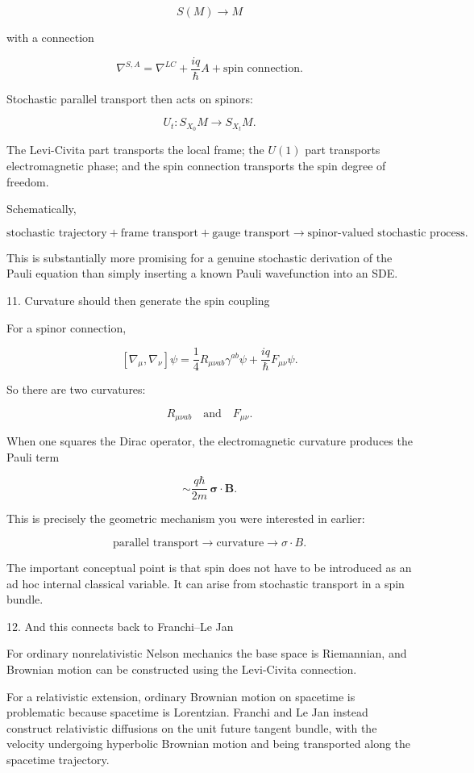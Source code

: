 $$ S(M)\rightarrow M $$

with a connection

$$ \nabla^{S,A} = \nabla^{LC} + \frac{iq}{\hbar}A + \text{spin connection}. $$

Stochastic parallel transport then acts on spinors:

$$ \boxed{ U_t: S_{X_0}M\rightarrow S_{X_t}M. } $$

The Levi-Civita part transports the local frame; the \(U(1)\) part transports electromagnetic phase; and the spin connection transports the spin degree of freedom.

Schematically,

$$ \boxed{ \text{stochastic trajectory} + \text{frame transport} + \text{gauge transport} \rightarrow \text{spinor-valued stochastic process}. } $$

This is substantially more promising for a genuine stochastic derivation of the Pauli equation than simply inserting a known Pauli wavefunction into an SDE.

11. Curvature should then generate the spin coupling

For a spinor connection,

$$ [\nabla_\mu,\nabla_\nu]\psi = \frac14R_{\mu\nu ab}\gamma^{ab}\psi + \frac{iq}{\hbar}F_{\mu\nu}\psi. $$

So there are two curvatures:

$$ \boxed{ R_{\mu\nu ab} \quad\text{and}\quad F_{\mu\nu}. } $$

When one squares the Dirac operator, the electromagnetic curvature produces the Pauli term

$$ \sim \frac{q\hbar}{2m}\,\boldsymbol{\sigma}\cdot\mathbf B. $$

This is precisely the geometric mechanism you were interested in earlier:

$$ \boxed{ \text{parallel transport} \rightarrow \text{curvature} \rightarrow \sigma\cdot B. } $$

The important conceptual point is that spin does not have to be introduced as an ad hoc internal classical variable. It can arise from stochastic transport in a spin bundle.

12. And this connects back to Franchi--Le Jan

For ordinary nonrelativistic Nelson mechanics the base space is Riemannian, and Brownian motion can be constructed using the Levi-Civita connection.

For a relativistic extension, ordinary Brownian motion on spacetime is problematic because spacetime is Lorentzian. Franchi and Le Jan instead construct relativistic diffusions on the unit future tangent bundle, with the velocity undergoing hyperbolic Brownian motion and being transported along the spacetime trajectory.

